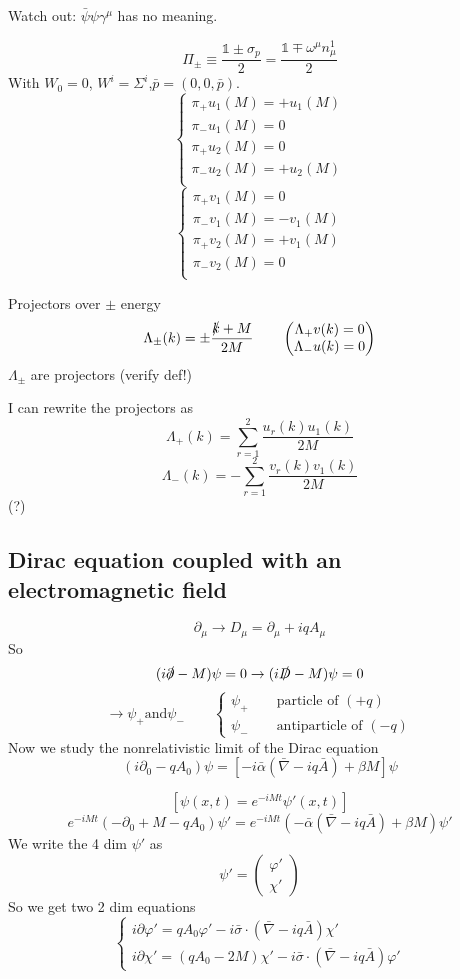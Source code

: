 Watch out: $\bar{\psi}\psi\gamma^\mu$ has no meaning.


\[\Pi_\pm \equiv \frac{\mathbb{1}\pm\sigma_p}{2} = \frac{\mathbb{1}\mp\omega^\mu n_\mu^1}{2}\]
With $W_0 = 0$, $W^i=\Sigma^i$,$\bar{p}=(0,0,\bar{p})$.
\[ \begin{cases}
\pi_+ u_1(M) = +u_1(M) \\
\pi_- u_1(M) = 0 \\
\pi_+ u_2(M) = 0 \\
\pi_- u_2(M) = +u_2(M) \\
\end{cases} \]
\[ \begin{cases}
\pi_+ v_1(M) = 0 \\
\pi_- v_1(M) = -v_1(M) \\
\pi_+ v_2(M) = +v_1(M) \\
\pi_- v_2(M) = 0 \\
\end{cases} \]

Projectors over $\pm$ energy
\[ \Lambda_\pm(k) = \pm \frac{\slashed{k}+M}{2M} \qquad \begin{pmatrix}
\Lambda_+v(k) = 0 \\ \Lambda_-u(k) = 0
\end{pmatrix} \]
$\Lambda_\pm$ are projectors (verify def!)

I can rewrite the projectors as
\[ \Lambda_+(k) = \sum^2_{r=1}\frac{u_r(k)u_1(k)}{2M} \]
\[ \Lambda_-(k) = -\sum^2_{r=1}\frac{v_r(k)v_1(k)}{2M} \]
(?)

\subsection{Dirac equation coupled with an electromagnetic field}
\[\partial_\mu \rightarrow D_\mu = \partial_\mu + iqA_\mu\]
So
\[ (i\slashed{\partial}-M)\psi = 0 \rightarrow (i\slashed{D}-M)\psi = 0 \]
\[\to \psi_+ \text{and} \psi_- \qquad \begin{cases}
\psi_+ \qquad \text{particle of } (+q) \\
\psi_- \qquad \text{antiparticle of } (-q) 
\end{cases}\]
Now we study the nonrelativistic limit of the Dirac equation
\[ (i\partial_0 - qA_0)\psi = \left[-i \bar{\alpha}(\bar{\nabla}-iq \bar{A})+\beta M\right]\psi \]

\[ \left[\psi(x,t) = e^{-iMt}\psi'(x,t)\right] \]
\[ e^{-iMt}\left(-\partial_0 + M - qA_0\right)\psi' = e^{-iMt}\left(-\bar{\alpha}(\bar{\nabla}-iq \bar{A}) + \beta M\right)\psi' \]
We write the 4 dim $\psi'$ as
\[ \psi' = \begin{pmatrix}
\varphi' \\ \chi'
\end{pmatrix} \]
So we get two 2 dim equations
\[ \begin{cases}
i\partial \varphi' = qA_0\varphi' - i \bar{\sigma}\cdot \left(\bar{\nabla}-iq \bar{A}\right)\chi' \\
i\partial \chi' = (qA_0-2M)\chi' - i \bar{\sigma}\cdot \left(\bar{\nabla}-iq \bar{A}\right)\varphi'
\end{cases} \]

